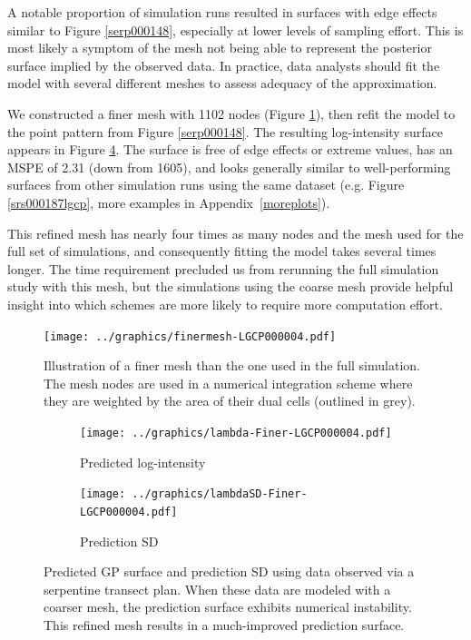 \documentclass[review]{elsarticle}
\begin{document}
A notable proportion of simulation runs resulted in surfaces with edge effects
similar to Figure \ref{serp000148}, especially at lower levels of sampling
effort. This is most likely a symptom of the mesh not being able to represent
the posterior surface implied by the observed data. In practice, data analysts
should fit the model with several different meshes to assess adequacy of the
approximation.

We constructed a finer mesh with 1102 nodes (Figure \ref{meshfiner}), then
refit the model to the point pattern from Figure \ref{serp000148}. The
resulting log-intensity surface appears in Figure \ref{finer}. The surface is
free of edge effects or extreme values, has an MSPE of 2.31 (down from 1605),
and looks generally similar to well-performing surfaces from other simulation
runs using the same dataset (e.g. Figure \ref{srs000187lgcp}, more examples
in Appendix~\ref{moreplots}).

This refined mesh has nearly four times as many nodes and the mesh used for
the full set of simulations, and consequently fitting the model takes several
times longer. The time requirement precluded us from rerunning the full
simulation study with this mesh, but the simulations using the coarse mesh
provide helpful insight into which schemes are more likely to require more
computation effort.

\begin{figure}
\texttt{[image: ../graphics/finermesh-LGCP000004.pdf]}
\caption{Illustration of a finer mesh than the one used in the full simulation.
The mesh nodes are used in a numerical integration scheme where they are
weighted by the area of their dual cells (outlined in grey).}
\label{meshfiner}
\end{figure}

\begin{figure}

\begin{subfigure}{5in}
\texttt{[image: ../graphics/lambda-Finer-LGCP000004.pdf]}
\caption{Predicted log-intensity}
\label{lambdafinerlgcp}
\end{subfigure}

\begin{subfigure}{5in}
\texttt{[image: ../graphics/lambdaSD-Finer-LGCP000004.pdf]}
\caption{Prediction SD}
\label{sdfinerlgcp}
\end{subfigure}

\caption{Predicted GP surface and prediction SD using data observed via a
serpentine transect plan. When these data are modeled with a coarser mesh, the
prediction surface exhibits numerical instability. This refined mesh results in
a much-improved prediction surface.}
\label{finer}
\end{figure}
\end{document}
